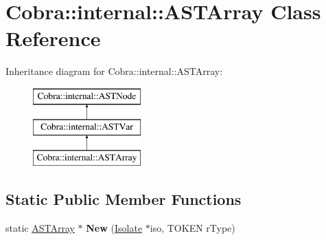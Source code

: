 \hypertarget{class_cobra_1_1internal_1_1_a_s_t_array}{\section{Cobra\+:\+:internal\+:\+:A\+S\+T\+Array Class Reference}
\label{class_cobra_1_1internal_1_1_a_s_t_array}
}
Inheritance diagram for Cobra\+:\+:internal\+:\+:A\+S\+T\+Array\+:\begin{figure}[H]
\begin{center}
\leavevmode
\includegraphics[height=3.000000cm]{class_cobra_1_1internal_1_1_a_s_t_array}
\end{center}
\end{figure}
\subsection*{Static Public Member Functions}
\begin{DoxyCompactItemize}
\item 
\hypertarget{class_cobra_1_1internal_1_1_a_s_t_array_a65f16e0155d326bd9bdf649057f0ca52}{static \hyperlink{class_cobra_1_1internal_1_1_a_s_t_array}{A\+S\+T\+Array} $\ast$ {\bfseries New} (\hyperlink{class_cobra_1_1internal_1_1_isolate}{Isolate} $\ast$iso, T\+O\+K\+E\+N r\+Type)}\label{class_cobra_1_1internal_1_1_a_s_t_array_a65f16e0155d326bd9bdf649057f0ca52}

\end{DoxyCompactItemize}
